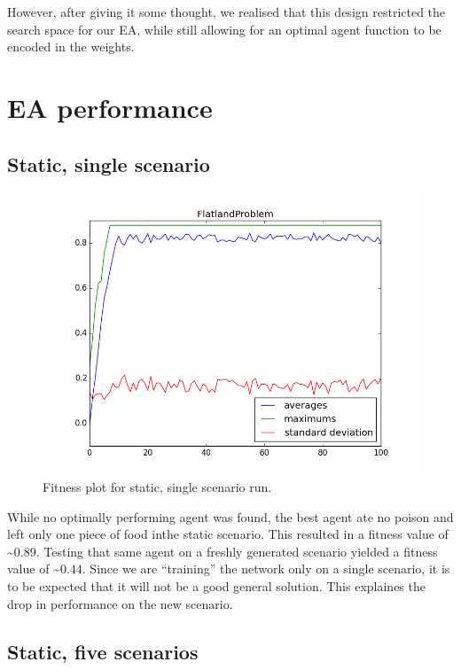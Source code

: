\documentclass[twoside]{article}
\begin{document}
\begin{multicols}{2}
  However, after giving it some thought, we realised that this design restricted the search space for our EA, while still allowing for an optimal agent function to be encoded in the weights.


  \section{EA performance}

  \subsection{Static, single scenario}

  \begin{figure}[H]
    \centering
    \includegraphics[width=\linewidth]{images/static_1.png}
    \caption{Fitness plot for static, single scenario run.} \label{fig:static-single}
  \end{figure}

  While no optimally performing agent was found, the best agent ate no poison and left only one piece of food inthe static scenario.
  This resulted in a fitness value of \textasciitilde $0.89$.
  Testing that same agent on a freshly generated scenario yielded a fitness value of \textasciitilde $0.44$.
  Since we are ``training'' the network only on a single scenario, it is to be expected that it will not be a good general solution.
  This explaines the drop in performance on the new scenario.
  
  \subsection{Static, five scenarios}


\end{multicols}
\end{document}
